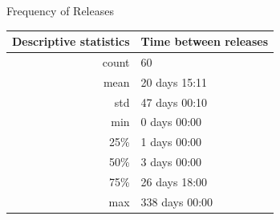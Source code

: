 \cleardoublepage
\changepapersize{305.3mm:210mm}

{
	\LARGE
	\noindent Frequency of Releases\par
	\vspace{0.2cm}
}

\begin{multicols}{3}
	\noindent
	\begin{minipage}{\columnwidth + \columnsep}
		\begin{tabular}{|r|l|}
			\hline
			Descriptive statistics & Time between releases \\
			\hline
			count                  & 60                    \\
			mean                   & 20 days 15:11         \\
			std                    & 47 days 00:10         \\
			min                    & 0 days 00:00          \\
			25\%                   & 1 days 00:00          \\
			50\%                   & 3 days 00:00          \\
			75\%                   & 26 days 18:00         \\
			max                    & 338 days 00:00        \\
			\hline
		\end{tabular}
		\label{tab:release-statistics}
	\end{minipage}
	\columnbreak
	\noindent
	\begin{minipage}{\columnwidth}
		\label{fig:releases-histogram}
	\end{minipage}
\end{multicols}

